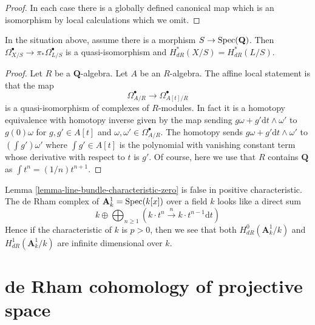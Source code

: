 \begin{proof}
In each case there is a globally defined canonical map which
is an isomorphism by local calculations which we omit.
\end{proof}

\begin{lemma}
\label{lemma-line-bundle-characteristic-zero}
In the situation above, assume there is a morphism $S \to \mathop{\mathrm{Spec}}(\mathbf{Q})$.
Then $\Omega^\bullet_{X/S} \to \pi_*\Omega^\bullet_{L/S}$ is a
quasi-isomorphism and $H_{dR}^*(X/S) = H_{dR}^*(L/S)$.
\end{lemma}

\begin{proof}
Let $R$ be a $\mathbf{Q}$-algebra. Let $A$ be an $R$-algebra.
The affine local statement is that the map
$$
\Omega^\bullet_{A/R} \longrightarrow \Omega^\bullet_{A[t]/R}
$$
is a quasi-isomorphism of complexes of $R$-modules. In fact it is a
homotopy equivalence with homotopy inverse given by the map sending
$g \omega + g' \text{d}t \wedge \omega'$ to $g(0)\omega$ for
$g, g' \in A[t]$ and $\omega, \omega' \in \Omega^\bullet_{A/R}$.
The homotopy sends $g \omega + g' \text{d}t \wedge \omega'$
to $(\int g') \omega'$ where $\int g' \in A[t]$ is the polynomial
with vanishing constant term whose derivative with respect to $t$
is $g'$. Of course, here we use that $R$ contains $\mathbf{Q}$
as $\int t^n = (1/n)t^{n + 1}$.
\end{proof}

\begin{example}
\label{example-affine-line}
Lemma \ref{lemma-line-bundle-characteristic-zero} is
false in positive characteristic. The de Rham complex of
$\mathbf{A}^1_k = \mathop{\mathrm{Spec}}(k[x])$ over a field $k$ looks like a direct sum
$$
k \oplus
\bigoplus\nolimits_{n \geq 1}
(k \cdot t^n \xrightarrow{n}
k \cdot t^{n - 1} \text{d}t)
$$
Hence if the characteristic of $k$ is $p > 0$, then
we see that both $H^0_{dR}(\mathbf{A}^1_k/k)$ and
$H^1_{dR}(\mathbf{A}^1_k/k)$
are infinite dimensional over $k$.
\end{example}








\section{de Rham cohomology of projective space}
\label{section-projective-space}

